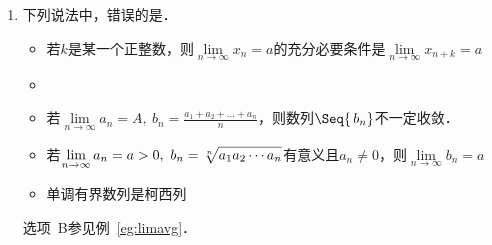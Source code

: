 \begin{enumerate}
    对选项~D的证明：
    \begin{proof}
      存在正整数\(N_1\)使得当\(n \ge N_1\)时都有
      \begin{gather*}
        \abs[\bigg]{\,\frac{a_{n+1}}{a_n}\,} < \frac{1+q}{2} = q + \frac{1-q}{2}, \\
        \shortintertext{从而当\(n > N\)时有}
        0 < \abs[\big]{\,a_n} < \abs[\big]{\,a_{N_1}} \, \paren[\bigg]{\frac{1+q}{2}}^{n-N_1}.
      \end{gather*}
      易知\(\lim\limits_{n\to\infty} \abs[\big]{\,a_{N_1}} \, \paren[\Big]{\frac{1+q}{2}}^{n-N_1} = 0\)，所以由夹逼定理可知\(\lim_{n\to\infty} \abs*{\,a_n} = 0\)，从而
      \begin{equation*}
        \lim_{n\to\infty} a_n = 0.
        \qedhere
      \end{equation*}
    \end{proof}
  \fi

\item 下列说法中，错误的是\uline{\makebox[10em]{}}．
  \begin{itemize}
    \renewcommand{\labelitemi}{\faCircleThin}
    \addtolength{\itemsep}{.67ex}
  \item 若\(k\)是某一个正整数，则\(\lim\limits_{n\to\infty} x_n = a\)的充分必要条件是\(\lim\limits_{n\to\infty} x_{n+k} = a\)
    \ifshowsol
    \item[\faCircle]
    \else
    \item
    \fi
    若\(\lim\limits_{n\to\infty} a_n = A,\ b_n = \frac{a_1 + a_2 + \dots + a_n}{n}\)，则数列\(\Seq{\,b_n}\)不一定收敛．
  \item 若\(\lim\limits_{n\to\infty} a_n = a > 0,\ b_n = \sqrt[n]{a_1 a_2 \dotsm a_n \mathstrut}\)有意义且\(a_n \ne 0\)，则\(\lim\limits_{n\to\infty} b_n = a\)
  \item 单调有界数列是柯西列
  \end{itemize}

  \ifshowsol
    选项~B参见例~\ref{eg:limavg}．


\end{enumerate}
